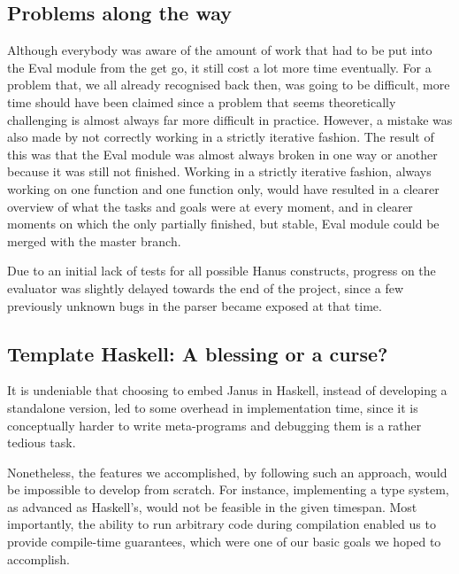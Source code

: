 \documentclass[12pt,a4paper]{article}
\begin{document}
    \subsection{Problems along the way}
        Although everybody was aware of the amount of work that had to be put into the Eval module from the get go, it still cost a lot more time eventually. For a problem that, we all already recognised back then, was going to be difficult, more time should have been claimed since a problem that seems theoretically challenging is almost always far more difficult in practice. However, a mistake was also made by not correctly working in a strictly iterative fashion. The result of this was that the Eval module was almost always broken in one way or another because it was still not finished. Working in a strictly iterative fashion, always working on one function and one function only, would have resulted in a clearer overview of what the tasks and goals were at every moment, and in clearer moments on which the only partially finished, but stable, Eval module could be merged with the master branch.
        
Due to an initial lack of tests for all possible Hanus constructs, progress on the evaluator was slightly delayed towards the end of the project, since a few previously unknown bugs in the parser became exposed at that time. 

	\subsection{Template Haskell: A blessing or a curse?}
It is undeniable that choosing to embed Janus in Haskell, instead of developing a standalone version, led to some overhead in implementation time, since it is conceptually harder to write meta-programs and debugging them is a rather tedious task.

Nonetheless, the features we accomplished, by following such an approach, would be impossible to develop from scratch. For instance, implementing a type system, as advanced as Haskell's, would not be feasible in the given timespan. Most importantly, the ability to run arbitrary code during compilation enabled us to provide compile-time guarantees, which were one of our basic goals we hoped to accomplish.
\end{document}
